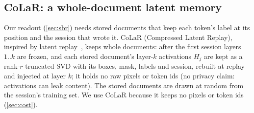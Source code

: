\documentclass[10pt,twocolumn,letterpaper]{article}
\begin{document}


\subsection{CoLaR: a whole-document latent memory}
\label{sec:memory}
Our readout (\cref{sec:sbr}) needs stored documents that keep each token's label at its position and the session that wrote it. CoLaR (Compressed Latent Replay), inspired by latent replay~\citep{hayes2020remind,pellegrini2020latent}, keeps whole documents: after the first session layers $1..k$ are frozen, and each stored document's layer-$k$ activations $H_j$ are kept as a rank-$r$ truncated SVD with its boxes, mask, labels and session, rebuilt at replay and injected at layer $k$; it holds no raw pixels or token ids (no privacy claim: activations can leak content). The stored documents are drawn at random from the session's training set. We use CoLaR because it keeps no pixels or token ids (\cref{sec:cost}).
\end{document}
